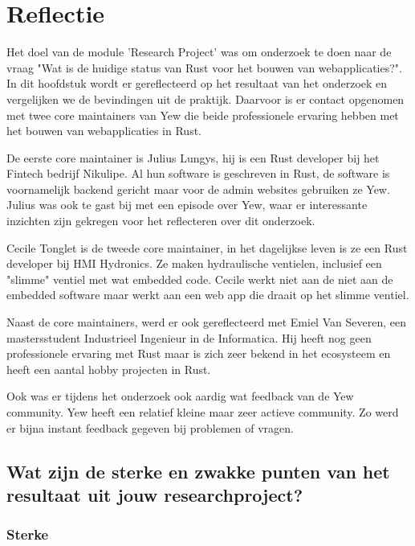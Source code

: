 \chapter{Reflectie}
\label{reflectie}

Het doel van de module 'Research Project' was om onderzoek te doen naar de vraag "Wat is de huidige
status van Rust voor het bouwen van webapplicaties?". In dit hoofdstuk wordt er gereflecteerd op het
resultaat van het onderzoek en vergelijken we de bevindingen uit de praktijk. Daarvoor is er contact
opgenomen met twee core maintainers van Yew die beide professionele ervaring hebben met het bouwen
van webapplicaties in Rust. 

De eerste core maintainer is Julius Lungys, hij is een Rust developer bij het Fintech bedrijf
Nikulipe. Al hun software is geschreven in Rust, de software is voornamelijk backend gericht maar
voor de admin websites gebruiken ze Yew. Julius was ook te gast bij 
\cite{podcast} met een episode over Yew, waar er interessante inzichten zijn gekregen voor het
reflecteren over dit onderzoek.

Cecile Tonglet is de tweede core maintainer, in het dagelijkse leven is ze een Rust developer bij
HMI Hydronics. Ze maken hydraulische ventielen, inclusief een "slimme" ventiel met wat embedded
code. Cecile werkt niet aan de niet aan de embedded software maar werkt aan een web app die draait
op het slimme ventiel.

Naast de core maintainers, werd er ook gereflecteerd met Emiel Van Severen, een mastersstudent
Industrieel Ingenieur in de Informatica. Hij heeft nog geen professionele ervaring met Rust maar is
zich zeer bekend in het ecosysteem en heeft een aantal hobby projecten in Rust.

Ook was er tijdens het onderzoek ook aardig wat feedback van de Yew community. Yew heeft een
relatief kleine maar zeer actieve community. Zo werd er bijna instant feedback gegeven bij problemen
of vragen.

\clearpage

\section{Wat zijn de sterke en zwakke punten van het resultaat uit jouw researchproject?}

\subsection{Sterke}

